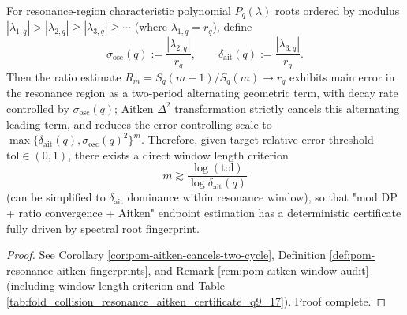 \begin{conclusion}\label{con:xi-terminal-resonance-aitken-certificate-window-law}
For resonance-region characteristic polynomial \(P_q(\lambda)\) roots ordered by modulus \( |\lambda_{1,q}|>|\lambda_{2,q}|\ge|\lambda_{3,q}|\ge\cdots \) (where \(\lambda_{1,q}=r_q\)), define
\[
\sigma_{\mathrm{osc}}(q):=\frac{|\lambda_{2,q}|}{r_q},\qquad
\delta_{\mathrm{ait}}(q):=\frac{|\lambda_{3,q}|}{r_q}.
\]
Then the ratio estimate
\(
R_m=S_q(m+1)/S_q(m)\to r_q
\)
exhibits main error in the resonance region as a two-period alternating geometric term, with decay rate controlled by \(\sigma_{\mathrm{osc}}(q)\);
Aitken \(\Delta^2\) transformation strictly cancels this alternating leading term, and reduces the error controlling scale to
\(
\max\{\delta_{\mathrm{ait}}(q),\sigma_{\mathrm{osc}}(q)^2\}^m
\).
Therefore, given target relative error threshold \(\mathrm{tol}\in(0,1)\), there exists a direct window length criterion
\[
m\gtrsim \frac{\log(\mathrm{tol})}{\log \delta_{\mathrm{ait}}(q)}
\]
(can be simplified to \(\delta_{\mathrm{ait}}\) dominance within resonance window), so that "mod DP + ratio convergence + Aitken" endpoint estimation has a deterministic certificate fully driven by spectral root fingerprint.
\end{conclusion}
\begin{proof}[Proof]
See Corollary \ref{cor:pom-aitken-cancels-two-cycle}, Definition \ref{def:pom-resonance-aitken-fingerprints}, and Remark \ref{rem:pom-aitken-window-audit} (including window length criterion and Table \ref{tab:fold_collision_resonance_aitken_certificate_q9_17}). Proof complete.
\end{proof}


